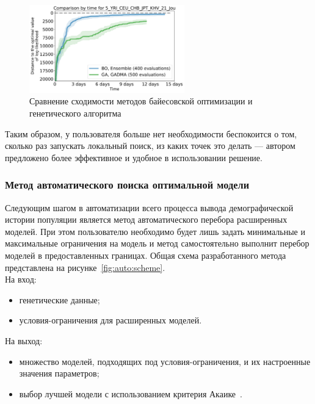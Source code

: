 \documentclass[a4paper,14pt,oneside,openany,article]{memoir}
\begin{document}
\begin{figure}[t!]
    \centering
    \includegraphics[width=0.6\textwidth]{images/bo_ga_comp_5_YRI_CEU_CHB_JPT_KHV_21_Jou.pdf}
    \caption{Сравнение сходимости методов байесовской оптимизации и генетического алгоритма}
    \label{fig:syn_ru:bo_ga_comp}
\end{figure}

Таким образом, у пользователя больше нет необходимости беспокоится о том, сколько раз запускать локальный поиск, из каких точек это делать --- автором предложено более эффективное и удобное в использовании решение.

\subsubsection*{Метод автоматического поиска оптимальной модели}

Следующим шагом в автоматизации всего процесса вывода демографической истории популяции является метод автоматического перебора расширенных моделей.
При этом пользователю необходимо будет лишь задать минимальные и максимальные ограничения на модель и метод самостоятельно выполнит перебор моделей в предоставленных границах.
Общая схема разработанного метода представлена на рисунке~\ref{fig:auto:scheme}.\\

На вход:
\begin{itemize}
    \item генетические данные;
    \item условия-ограничения для расширенных моделей.
\end{itemize}

На выход:
\begin{itemize}
    \item множество моделей, подходящих под условия-ограничения, и их настроенные значения параметров;
    \item выбор лучшей модели с использованием критерия Акаике~.\\
\end{itemize}
\end{document}
